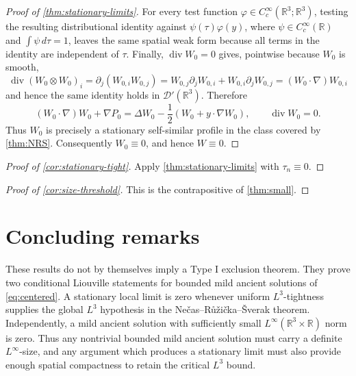 \documentclass[11pt]{amsart}
\theoremstyle{plain}
\theoremstyle{definition}
\theoremstyle{remark}
\numberwithin{equation}{section}
\begin{document}
\begin{proof}[Proof of \cref{thm:stationary-limits}]
For every test function \(\varphi\in C_c^\infty(\mathbb R^3;\mathbb R^3)\),
testing the resulting distributional identity against
\(\psi(\tau)\varphi(y)\), where \(\psi\in C_c^\infty(\mathbb R)\) and
\(\int\psi\,d\tau=1\), leaves the same spatial weak form because all terms in
the identity are independent of \(\tau\).  Finally,
\(\operatorname{div}W_0=0\) gives, pointwise because \(W_0\) is smooth,
\[
   \operatorname{div}(W_0\otimes W_0)_i
   =
   \partial_j(W_{0,i}W_{0,j})
   =
   W_{0,j}\partial_jW_{0,i}+W_{0,i}\partial_jW_{0,j}
   =
   (W_0\cdot\nabla)W_{0,i}
\]
and hence the same identity holds in \(\mathcal D'(\mathbb R^3)\).  Therefore
\[
   (W_0\cdot\nabla)W_0+\nabla P_0
   =
   \Delta W_0-\frac12(W_0+y\cdot\nabla W_0),
   \qquad \operatorname{div}W_0=0 .
\]
Thus \(W_0\) is precisely a stationary self-similar profile in the class
covered by \cref{thm:NRS}.  Consequently \(W_0\equiv0\), and hence
\(W\equiv0\).
\end{proof}

\begin{proof}[Proof of \cref{cor:stationary-tight}]
Apply \cref{thm:stationary-limits} with \(\tau_n\equiv0\).
\end{proof}

\begin{proof}[Proof of \cref{cor:size-threshold}]
This is the contrapositive of \cref{thm:small}.
\end{proof}

\section{Concluding remarks}

These results do not by themselves imply a Type I exclusion theorem.
They prove two conditional Liouville statements for bounded mild ancient
solutions of \eqref{eq:centered}.  A stationary local limit is zero whenever
uniform \(L^3\)-tightness supplies the global \(L^3\) hypothesis in the
Ne\v{c}as--R\r{u}\v{z}i\v{c}ka--\v{S}verak theorem.  Independently, a mild ancient solution with
sufficiently small \(L^\infty(\mathbb R^3\times\mathbb R)\) norm is zero.  Thus any
nontrivial bounded mild ancient solution must carry a definite
\(L^\infty\)-size, and any argument which produces a stationary limit must
also provide enough spatial compactness to retain the critical \(L^3\) bound.
\end{document}
